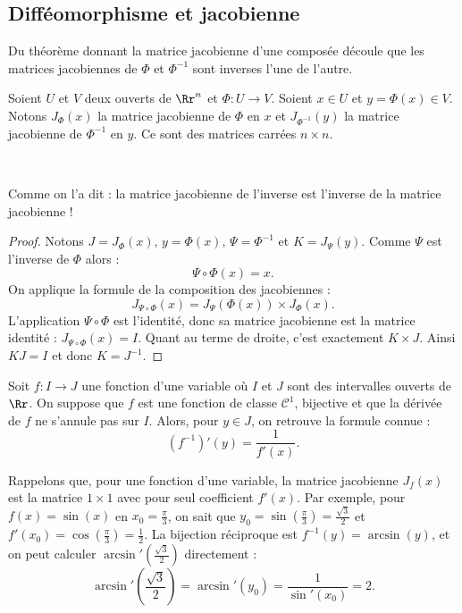 \documentclass[11pt, class=report,crop=false]{standalone}
\begin{document}
\subsection{Difféomorphisme et jacobienne}

Du théorème donnant la matrice jacobienne d'une composée découle que les matrices jacobiennes de $\Phi$ et $\Phi^{-1}$ sont inverses l'une de l'autre.

Soient $U$ et $V$ deux ouverts de $\Rr^n$ et $\Phi:U\to V$.
Soient $x \in U$ et $y = \Phi(x) \in V$.
Notons $J_\Phi(x)$ la matrice jacobienne de $\Phi$ en $x$ 
et $J_{\Phi^{-1}}(y)$ la matrice jacobienne de $\Phi^{-1}$ en $y$.
Ce sont des matrices carrées $n\times n$.

\begin{proposition}
\label{prop:invjacob}
~
\end{proposition}
Comme on l'a dit : la matrice jacobienne de l'inverse est l'inverse de la matrice jacobienne !

\begin{proof}
Notons $J = J_\Phi(x)$, $y = \Phi(x)$,  $\Psi = \Phi^{-1}$ et $K = J_\Psi(y)$.
Comme $\Psi$ est l'inverse de $\Phi$ alors :
$$\Psi \circ \Phi (x) = x.$$
On applique la formule de la composition des jacobiennes :
$$J_{\Psi \circ \Phi}(x) = J_\Psi(\Phi(x)) \times J_\Phi(x).$$
L'application $\Psi \circ \Phi$ est l'identité, donc sa matrice jacobienne est la matrice identité : $J_{\Psi \circ \Phi}(x) = I$.
Quant au terme de droite, c'est exactement $K \times J$.
Ainsi $K J = I$ et donc $K = J^{-1}$.
\end{proof}


\begin{exemple}
Soit $f : I  \to J$ une fonction d'une variable où $I$ et $J$ sont des intervalles ouverts de $\Rr$. 
On suppose que $f$ est une fonction de classe $\mathcal{C}^1$, bijective et que la dérivée de $f$ ne s'annule pas sur $I$. Alors, pour $y\in J$, on retrouve la formule connue :
$$\left(f^{-1}\right)'(y) = \frac{1}{f'(x)}.$$

Rappelons que, pour une fonction d'une variable, la matrice jacobienne $J_f(x)$ est la matrice $1 \times 1$ avec pour seul coefficient $f'(x)$.
Par exemple, pour $f(x) = \sin(x)$ en $x_0=\frac\pi3$, on sait que $y_0=\sin(\frac\pi3)=\frac{\sqrt3}2$ et $f'(x_0)=\cos(\frac\pi3)=\frac12$.
La bijection réciproque est $f^{-1}(y)=\arcsin(y)$, et on peut calculer $\arcsin'(\frac{\sqrt3}2)$ directement :
$$\arcsin'\left(\frac{\sqrt3}2\right) = \arcsin'(y_0) = \frac{1}{\sin'(x_0)} = 2.$$
\end{exemple}
\end{document}
